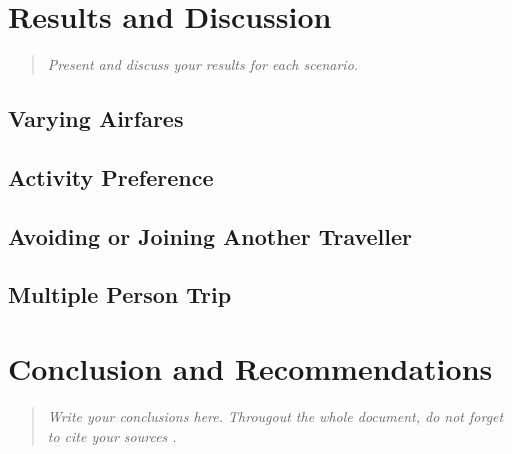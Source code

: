 \documentclass[12pt]{article}
\begin{document}
\section{Results and Discussion} 
\label{sec:results}


\begin{quote} \textit{
Present and discuss your results for each scenario.
} \end{quote}

\lipsum[3]

\subsection{Varying Airfares}


\subsection{Activity Preference}


\subsection{Avoiding or Joining Another Traveller}


\subsection{Multiple Person Trip}


\pagebreak

\section{Conclusion and Recommendations}
\label{sec:conc}


\begin{quote} \textit{
Write your conclusions here. Througout the whole document, do not forget to cite your sources \cite{example}.
} \end{quote}

\lipsum[3]


\pagebreak
\end{document}
